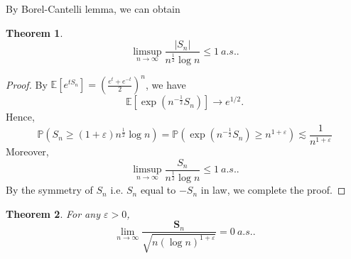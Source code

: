 \documentclass[11pt]{article}
\newtheorem{theorem}{Theorem}[section]
\theoremstyle{definition}
\newcommand{\abs}[1]{\left\vert#1\right\vert}
\begin{document}
{\color{blue} By Borel-Cantelli lemma, we can obtain 
\begin{theorem}
\[
\limsup_{n\rightarrow \infty} \frac{\abs{S_n}}{n^{\frac{1}{2}}\log n}\le 1\ a.s..
\]
\end{theorem}
\begin{proof}
  By $\mathbb{E}[e^{tS_n}]=\left(\frac{e^t+e^{-t}}{2}\right)^n$, we have 
\[
\mathbb{E}\left[\exp\left(n^{-\frac{1}{2}}S_n \right)\right]\rightarrow e^{1/2}.
\]
Hence, 
\[
\mathbb{P}(S_n\ge (1+\varepsilon)n^{\frac{1}{2}}\log n)=\mathbb{P}\left(\exp(n^{-\frac{1}{2}}S_n)\ge n^{1+\varepsilon}\right)\lesssim \frac{1}{n^{1+\varepsilon}}
\]
Moreover, 
\[
\limsup_{n\rightarrow \infty}\frac{S_n}{n^\frac{1}{2} \log n}\le 1\ a.s..
\]
By the symmetry of $S_n$ i.e. $S_n$ equal  to $-S_n$  in law, we complete the proof.
\end{proof}
}
\begin{theorem} For any $\varepsilon>0$,
 \[ \lim_{n\rightarrow \infty}\frac{\mathbf{S}_n}{\sqrt{n(\log n)^{1+\varepsilon}}}=0\ a.s..
\]
\end{theorem}
\end{document}
